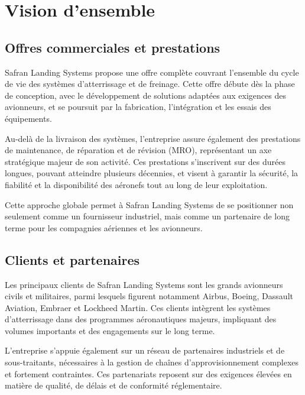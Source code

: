 \section*{Vision d'ensemble}

\subsection*{Offres commerciales et prestations}
{}
Safran Landing Systems propose une offre complète couvrant l’ensemble du cycle de vie des systèmes d’atterrissage et de freinage. Cette offre débute dès la phase de conception, avec le développement de solutions adaptées aux exigences des avionneurs, et se poursuit par la fabrication, l’intégration et les essais des équipements.

\noindent Au-delà de la livraison des systèmes, l’entreprise assure également des prestations de maintenance, de réparation et de révision (MRO), représentant un axe stratégique majeur de son activité. Ces prestations s’inscrivent sur des durées longues, pouvant atteindre plusieurs décennies, et visent à garantir la sécurité, la fiabilité et la disponibilité des aéronefs tout au long de leur exploitation.

\noindent Cette approche globale permet à Safran Landing Systems de se positionner non seulement comme un fournisseur industriel, mais comme un partenaire de long terme pour les compagnies aériennes et les avionneurs.

\subsection*{Clients et partenaires}
{}
Les principaux clients de Safran Landing Systems sont les grands avionneurs civils et militaires, parmi lesquels figurent notamment Airbus, Boeing, Dassault Aviation, Embraer et Lockheed Martin. Ces clients intègrent les systèmes d’atterrissage dans des programmes aéronautiques majeurs, impliquant des volumes importants et des engagements sur le long terme.

\noindent L’entreprise s’appuie également sur un réseau de partenaires industriels et de sous-traitants, nécessaires à la gestion de chaînes d’approvisionnement complexes et fortement contraintes. Ces partenariats reposent sur des exigences élevées en matière de qualité, de délais et de conformité réglementaire.

